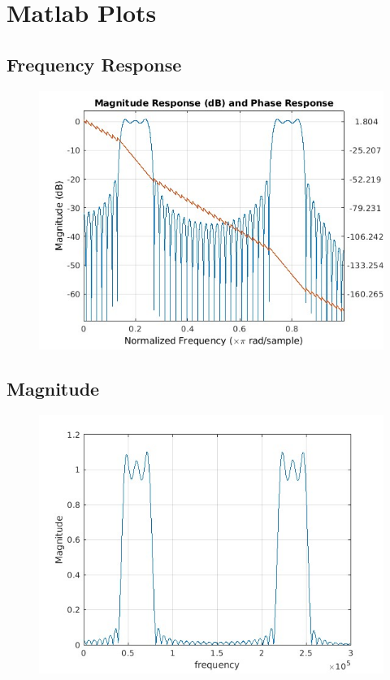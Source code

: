 \documentclass{article}
\begin{document}
\section{Matlab Plots}
\subsection{Frequency Response}
\begin{figure}[H]
\hspace*{-2.5cm}
    \centering
    \includegraphics[width=1.5\linewidth, height=0.65\textheight]{Multiband_freq.jpg}
    \label{fig:my_label}
\end{figure}

\subsection{Magnitude}
\begin{figure}[H]
\hspace*{-4cm}
    \centering
    \includegraphics[width=1.6\linewidth, height=0.65\textheight]{Multiband_mag.jpg}
    \label{fig:my_label}
\end{figure}
\end{document}
